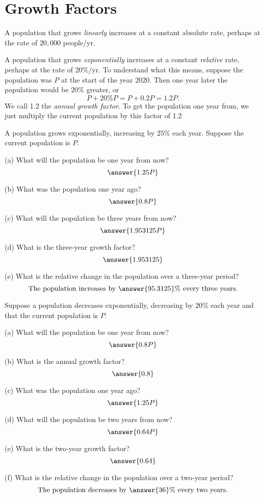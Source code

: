 \documentclass{ximera}
\begin{document}
\section{Growth Factors}
A population that grows \emph{linearly} increases at a constant absolute rate, perhaps at the rate of $20,000$ people/yr. 

A population that grows \emph{exponentially} increases at a constant \emph{relative} rate, perhaps at the rate of $20\%$/yr. To understand what this means, suppose the population was $P$ at the start of the year 2020. Then one year later the population would be $20\%$ greater, or 
\[
   P + 20\% P  = P + 0.2 P = 1.2P .
\]
We call 1.2 the \emph{annual growth factor}. To get the population one year from, we just multiply the current population by this factor of 1.2

\begin{question}  \label{Q00:ExponentialG}
A population grows exponentially, increasing by $25\%$ each year. Suppose the current population is $P$.

(a) What will the population be one year from now?
\[
\answer{1.25P}
\]
 
(b) What was the population one year ago?
\[
\answer{0.8P}
\]

(c) What will the population be three years from now?
\[
\answer{1.953125P}
\]

(d) What is the three-year growth factor?
\[
\answer{1.953125}
\]

(e) What is the relative change in the population over a three-year period?
\[
\text{The population increases by } \answer{95.3125}\% \text{ every three years.}
\]

\end{question}


\begin{question}  \label{Q1:ExponentialG}
Suppose a population decreases exponentially, decreasing by $20\%$ each year and that the current population is $P$. 

(a) What will the population be one year from now?  
\[
\answer{0.8P}
\]

(b) What is the annual growth factor?
\[
   \answer{0.8}
\]

(c) What was the population one year ago?
\[
\answer{1.25P}
\]

(d) What will the population be two years from now?
\[
\answer{0.64P}
\]

(e) What is the two-year growth factor?
\[
\answer{0.64}
\]

(f) What is the relative change in the population over a two-year period?
\[
\text{The population decreases by } \answer{36}\% \text{ every two years.}
\]

\end{question}
\end{document}
